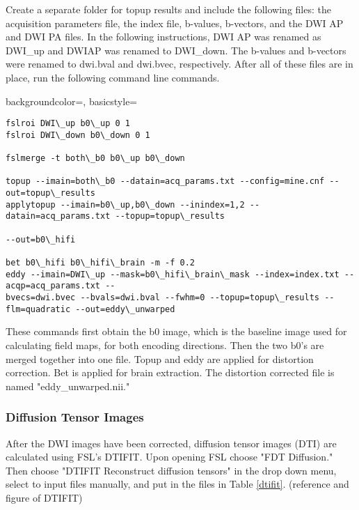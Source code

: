 Create a separate folder for topup results and include the following files: the acquisition parameters file, the index file, b-values, b-vectors, and the DWI AP and DWI PA files. In the following instructions, DWI AP was renamed as DWI\_up and DWIAP was renamed to DWI\_down. The b-values and b-vectors were renamed to dwi.bval and dwi.bvec, respectively. After all of these files are in place, run the following command line commands.

{
    backgroundcolor=\color{white},
    basicstyle=\scriptsize\color{black}\ttfamily
}

\begin{lstlisting}[style=DOS]
fslroi DWI\_up b0\_up 0 1
fslroi DWI\_down b0\_down 0 1

fslmerge -t both\_b0 b0\_up b0\_down

topup --imain=both\_b0 --datain=acq_params.txt --config=mine.cnf --out=topup\_results
applytopup --imain=b0\_up,b0\_down --inindex=1,2 --datain=acq_params.txt --topup=topup\_results 

--out=b0\_hifi

bet b0\_hifi b0\_hifi\_brain -m -f 0.2
eddy --imain=DWI\_up --mask=b0\_hifi\_brain\_mask --index=index.txt --acqp=acq_params.txt --
bvecs=dwi.bvec --bvals=dwi.bval --fwhm=0 --topup=topup\_results --flm=quadratic --out=eddy\_unwarped

\end{lstlisting}

These commands first obtain the b0 image, which is the baseline image used for calculating field maps, for both encoding directions. Then the two b0's are merged together into one file. Topup and eddy are applied for distortion correction. Bet is applied for brain extraction. The distortion corrected file is named "eddy\_unwarped.nii."

\subsubsection{Diffusion Tensor Images}

After the DWI images have been corrected, diffusion tensor images (DTI) are calculated using FSL's DTIFIT. Upon opening FSL choose "FDT Diffusion." Then choose "DTIFIT Reconstruct diffusion tensors" in the drop down menu, select to input files manually, and put in the files in Table \ref{dtifit}. (reference and figure of DTIFIT) 

